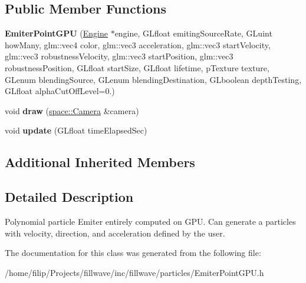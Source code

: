 \subsection*{Public Member Functions}
\begin{DoxyCompactItemize}
\item 
\hypertarget{classfillwave_1_1particles_1_1EmiterPointGPU_a2919404fb0957db6954f201e4b24df02}{}{\bfseries Emiter\+Point\+G\+P\+U} (\hyperlink{classfillwave_1_1Engine}{Engine} $\ast$engine, G\+Lfloat emiting\+Source\+Rate, G\+Luint how\+Many, glm\+::vec4 color, glm\+::vec3 acceleration, glm\+::vec3 start\+Velocity, glm\+::vec3 robustness\+Velocity, glm\+::vec3 start\+Position, glm\+::vec3 robustness\+Position, G\+Lfloat start\+Size, G\+Lfloat lifetime, p\+Texture texture, G\+Lenum blending\+Source, G\+Lenum blending\+Destination, G\+Lboolean depth\+Testing, G\+Lfloat alpha\+Cut\+Off\+Level=0.)\label{classfillwave_1_1particles_1_1EmiterPointGPU_a2919404fb0957db6954f201e4b24df02}

\item 
\hypertarget{classfillwave_1_1particles_1_1EmiterPointGPU_a2188ac7f0ad767c46c9a72576041c5a1}{}void {\bfseries draw} (\hyperlink{classfillwave_1_1space_1_1Camera}{space\+::\+Camera} \&camera)\label{classfillwave_1_1particles_1_1EmiterPointGPU_a2188ac7f0ad767c46c9a72576041c5a1}

\item 
\hypertarget{classfillwave_1_1particles_1_1EmiterPointGPU_ab5b0ef9c79b0210be09a7dd1825a7423}{}void {\bfseries update} (G\+Lfloat time\+Elapsed\+Sec)\label{classfillwave_1_1particles_1_1EmiterPointGPU_ab5b0ef9c79b0210be09a7dd1825a7423}

\end{DoxyCompactItemize}
\subsection*{Additional Inherited Members}


\subsection{Detailed Description}
Polynomial particle Emiter entirely computed on G\+P\+U. Can generate a particles with velocity, direction, and acceleration defined by the user. 

The documentation for this class was generated from the following file\+:\begin{DoxyCompactItemize}
\item 
/home/filip/\+Projects/fillwave/inc/fillwave/particles/Emiter\+Point\+G\+P\+U.\+h\end{DoxyCompactItemize}
